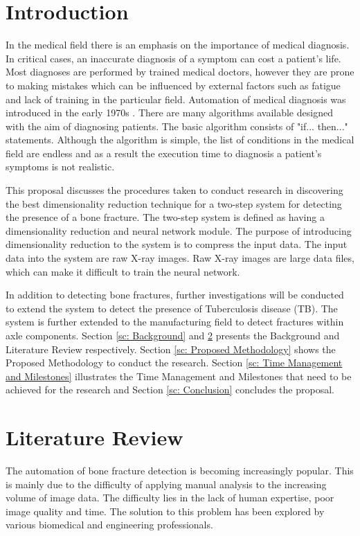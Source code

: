 \documentclass[11pt]{article}
\begin{document}
	\section{Introduction}
	In the medical field there is an emphasis on the importance of medical diagnosis. In critical cases, an inaccurate diagnosis of a symptom can cost a patient's life. Most diagnoses are performed by trained medical doctors, however they are prone to making mistakes which can be influenced by external factors such as fatigue and lack of training in the particular field. Automation of medical diagnosis was introduced in the early 1970s \cite{Ramesh2004}. There are many algorithms available designed with the aim of diagnosing patients. The basic algorithm consists of "if... then..." statements. Although the algorithm is simple, the list of conditions in the medical field are endless and as a result the execution time to diagnosis a patient's symptoms is not realistic. 
	
	This proposal discusses the procedures taken to conduct research in discovering the best dimensionality reduction technique for a two-step system for detecting the presence of a bone fracture. The two-step system is defined as having a dimensionality reduction and neural network module. The purpose of introducing dimensionality reduction to the system is to compress the input data. The input data into the system are raw X-ray images. Raw X-ray images are large data files, which can make it difficult to train the neural network.
	
	In addition to detecting bone fractures, further investigations will be conducted to extend the system to detect the presence of Tuberculosis disease (TB). The system is further extended to the manufacturing field to detect fractures within axle components. Section \ref{sc: Background} and \ref{sc: Literature Review} presents the Background and Literature Review respectively. Section \ref{sc: Proposed Methodology} shows the Proposed Methodology to conduct the research. Section \ref{sc: Time Management and Milestones} illustrates the Time Management and Milestones that need to be achieved for the research and Section \ref{sc: Conclusion} concludes the proposal. 
	
	\section{Literature Review}
	\label{sc: Literature Review}
	The automation of bone fracture detection is becoming increasingly popular. This is mainly due to the difficulty of applying manual analysis to the increasing volume of image data. The difficulty lies in the lack of human expertise, poor image quality and time. The solution to this problem has been explored by various biomedical and engineering professionals. 
	
\end{document}
